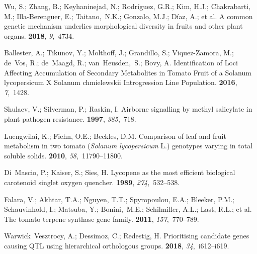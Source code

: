 \documentclass[applsci,article,accept,moreauthors,pdftex]{Definitions/mdpi}
\begin{document}
{\begin{thebibliography}{999}
{
Wu, S.; Zhang, B.; Keyhaninejad, N.; Rodríguez, G.R.; Kim, H.J.; Chakrabarti, M.; Illa-Berenguer, E.; Taitano,~N.K.; Gonzalo, M.J.; Díaz, A.; et al.
\newblock A common genetic mechanism underlies morphological diversity in
  fruits and other plant organs.
 {\bf 2018}, {\em 9},~4734.

Ballester, A.; Tikunov, Y.; Molthoff, J.; Grandillo, S.; Viquez-Zamora, M.;
  de~Vos, R.; de~Maagd, R.; van~Heusden,~S.; Bovy, A.
\newblock Identification of Loci Affecting Accumulation of Secondary
  Metabolites in Tomato Fruit of a Solanum lycopersicum X Solanum chmielewskii
  Introgression Line Population.
 {\bf 2016}, {\em 7},~1428.

Shulaev, V.; Silverman, P.; Raskin, I.
\newblock Airborne signalling by methyl salicylate in plant pathogen
  resistance.
 {\bf 1997}, {\em 385},~718.

Luengwilai, K.; Fiehn, O.E.; Beckles, D.M.
\newblock Comparison of leaf and fruit metabolism in two tomato (\emph{Solanum
  lycopersicum} L.) genotypes varying in total soluble solids.
 {\bf 2010}, {\em
  58},~11790--11800.

Di~Mascio, P.; Kaiser, S.; Sies, H.
\newblock Lycopene as the most efficient biological carotenoid singlet oxygen
  quencher.
 {\bf 1989}, {\em
  274},~532--538.

Falara, V.; Akhtar, T.A.; Nguyen, T.T.; Spyropoulou, E.A.; Bleeker, P.M.;
  Schauvinhold, I.; Matsuba, Y.; Bonini,~M.E.; Schilmiller, A.L.; Last, R.L.;
  et al.
\newblock The tomato terpene synthase gene family.
 {\bf 2011}, {\em 157},~770--789.

Warwick~Vesztrocy, A.; Dessimoz, C.; Redestig, H.
\newblock Prioritising candidate genes causing QTL using hierarchical
  orthologous groups.
 {\bf 2018}, {\em 34},~i612--i619.

}
\end{thebibliography}}
\end{document}
